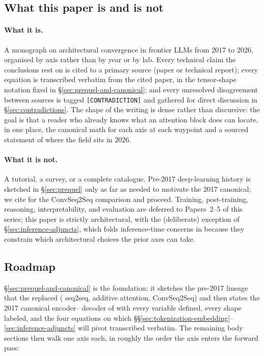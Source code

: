 \subsection*{What this paper is and is not}

\paragraph{What it is.} A monograph on architectural convergence in
frontier LLMs from 2017 to 2026, organised by axis rather than by
year or by lab. Every technical claim the conclusions rest on is cited to a
primary source (paper or technical report); every equation is
transcribed verbatim from the cited paper, in the tensor-shape
notation fixed in \S\ref{sec:prequel-and-canonical}; and every
unresolved disagreement between sources is tagged
\texttt{[CONTRADICTION]} and gathered for direct discussion in
\S\ref{sec:contradictions}. The shape of the writing is dense rather
than discursive: the goal is that a reader who already knows what an
attention block does can locate, in one place, the canonical math for
each axis at each waypoint and a sourced statement of where the field
sits in 2026.

\paragraph{What it is not.} A tutorial, a survey, or a complete
catalogue. Pre-2017 deep-learning history is sketched in
\S\ref{sec:prequel} only as far as needed to motivate the 2017
canonical; we cite \citet{vaswani2017} for the ConvSeq2Seq comparison
and proceed. Training, post-training, reasoning, interpretability, and
evaluation are deferred to Papers~2--5 of this series; this paper is
strictly architectural, with the (deliberate) exception of
\S\ref{sec:inference-adjuncts}, which folds inference-time concerns in
because they constrain which architectural choices the prior axes can
take.

\subsection*{Roadmap}

\S\ref{sec:prequel-and-canonical} is the foundation: it sketches the
pre-2017 lineage that the  replaced ( seq2seq, additive
attention, ConvSeq2Seq) and then states the 2017 canonical encoder--
decoder of \citet{vaswani2017} with every variable defined, every
shape labeled, and the four equations on which
\S\S\ref{sec:tokenization-embedding}--\ref{sec:inference-adjuncts}
will pivot transcribed verbatim. The remaining body sections then
walk one axis each, in roughly the order the axis enters the
forward pass:

